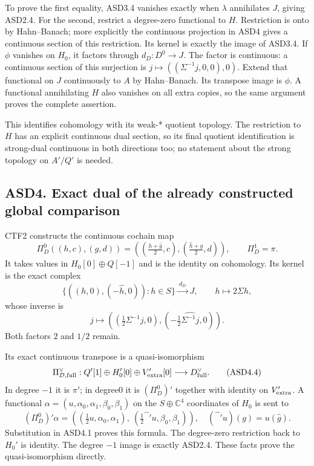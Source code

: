 To prove the first equality, ASD3.4 vanishes exactly when \(\lambda\)
annihilates \(J\), giving ASD2.4. For the second, restrict a degree-zero
functional to \(H\). Restriction is onto by Hahn--Banach; more
explicitly the continuous projection in ASD4 gives a continuous section
of this restriction. Its kernel is exactly the image of ASD3.4. If
\(\phi\) vanishes on \(H_0\), it factors through \(d_D:D^0\to J\). The
factor is continuous: a continuous section of this surjection is
\(j\mapsto((\Sigma^{-1}j,0,0),0)\). Extend that functional on \(J\)
continuously to \(A\) by Hahn--Banach. Its transpose image is \(\phi\).
A functional annihilating \(H\) also vanishes on all extra copies, so
the same argument proves the complete assertion.

This identifies cohomology with its weak-* quotient topology. The
restriction to \(H\) has an explicit continuous dual section, so its
final quotient identification is strong-dual continuous in both
directions too; no statement about the strong topology on \(A'/Q'\) is
needed.

\subsection{ASD4. Exact dual of the already constructed global
comparison}\label{asd4.-exact-dual-of-the-already-constructed-global-comparison}

CTF2 constructs the continuous cochain map \[
 \Pi_D^0((h,c),(g,d))
 =\left(\left(\tfrac{h+\widehat g}{2},c\right),
         \left(\tfrac{\widehat h+g}{2},d\right)\right),
 \qquad \Pi_D^1=\pi.
 \tag{ASD4.1}
\] It takes values in \(H_0[0]\oplus Q[-1]\) and is the identity on
cohomology. Its kernel is the exact complex \[
 \{((h,0),(-\widehat h,0)):h\in S\}
 \xrightarrow{\ d_D\ }J,\qquad h\longmapsto2\Sigma h,
 \tag{ASD4.2}
\] whose inverse is \[
 j\longmapsto
 \left(\left(\tfrac12\Sigma^{-1}j,0\right),
       \left(-\tfrac12\widehat{\Sigma^{-1}j},0\right)\right).
 \tag{ASD4.3}
\] Both factors \(2\) and \(1/2\) remain.

Its exact continuous transpose is a quasi-isomorphism \[
 \Pi_{D,{\rm full}}^\vee:
 Q'[1]\oplus H_0'[0]\oplus V_{\rm extra}'[0]
 \longrightarrow D_{\rm full}^\vee.
 \tag{ASD4.4}
\] In degree \(-1\) it is \(\pi'\); in degree0 it is \((\Pi_D^0)'\)
together with identity on \(V_{\rm extra}'\). A functional
\(\alpha=(u,\alpha_0,\alpha_1,\beta_0,\beta_1)\) on the
\(S\oplus\mathbb C^4\) coordinates of \(H_0\) is sent to \[
 (\Pi_D^0)'\alpha
 =
 \left(
  (\tfrac12u,\alpha_0,\alpha_1),\
  (\tfrac12\widehat{\phantom h}'u,\beta_0,\beta_1)
 \right),
 \quad
 (\widehat{\phantom h}'u)(g)=u(\widehat g).
 \tag{ASD4.5}
\] Substitution in ASD4.1 proves this formula. The degree-zero
restriction back to \(H_0'\) is identity. The degree \(-1\) image is
exactly ASD2.4. These facts prove the quasi-isomorphism directly.

